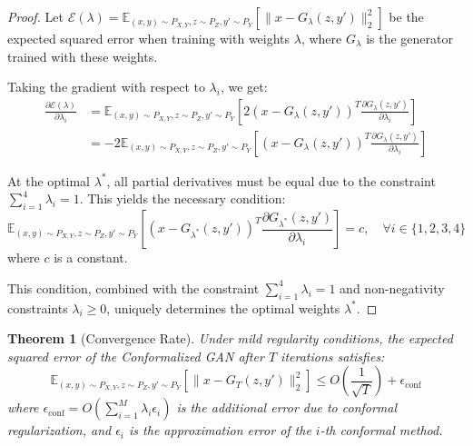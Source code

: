 \documentclass{article}
\theoremstyle{plain}
\newtheorem{theorem}{Theorem}
\theoremstyle{definition}
\theoremstyle{remark}
\begin{document}
\begin{proof}
Let $\mathcal{E}(\lambda) = \mathbb{E}_{(x,y) \sim P_{X,Y}, z \sim P_Z, y' \sim P_Y}\left[\|x - G_{\lambda}(z, y')\|_2^2\right]$ be the expected squared error when training with weights $\lambda$, where $G_{\lambda}$ is the generator trained with these weights.

Taking the gradient with respect to $\lambda_i$, we get:
\begin{align}
\frac{\partial \mathcal{E}(\lambda)}{\partial \lambda_i} &= \mathbb{E}_{(x,y) \sim P_{X,Y}, z \sim P_Z, y' \sim P_Y}\left[2(x - G_{\lambda}(z, y'))^T \frac{\partial G_{\lambda}(z, y')}{\partial \lambda_i}\right] \\
&= -2\mathbb{E}_{(x,y) \sim P_{X,Y}, z \sim P_Z, y' \sim P_Y}\left[(x - G_{\lambda}(z, y'))^T \frac{\partial G_{\lambda}(z, y')}{\partial \lambda_i}\right]
\end{align}

At the optimal $\lambda^*$, all partial derivatives must be equal due to the constraint $\sum_{i=1}^4 \lambda_i = 1$. This yields the necessary condition:
\begin{equation}
\mathbb{E}_{(x,y) \sim P_{X,Y}, z \sim P_Z, y' \sim P_Y}\left[(x - G_{\lambda^*}(z, y'))^T \frac{\partial G_{\lambda^*}(z, y')}{\partial \lambda_i}\right] = c, \quad \forall i \in \{1, 2, 3, 4\}
\end{equation}
where $c$ is a constant.

This condition, combined with the constraint $\sum_{i=1}^4 \lambda_i = 1$ and non-negativity constraints $\lambda_i \geq 0$, uniquely determines the optimal weights $\lambda^*$.
\end{proof}

\begin{theorem}[Convergence Rate]
Under mild regularity conditions, the expected squared error of the Conformalized GAN after $T$ iterations satisfies:
\begin{equation}
\mathbb{E}_{(x,y) \sim P_{X,Y}, z \sim P_Z, y' \sim P_Y}\left[\|x - G_T(z, y')\|_2^2\right] \leq O\left(\frac{1}{\sqrt{T}}\right) + \epsilon_{\text{conf}}
\end{equation}
where $\epsilon_{\text{conf}} = O\left(\sum_{i=1}^M \lambda_i \epsilon_i\right)$ is the additional error due to conformal regularization, and $\epsilon_i$ is the approximation error of the $i$-th conformal method.
\end{theorem}
\end{document}
